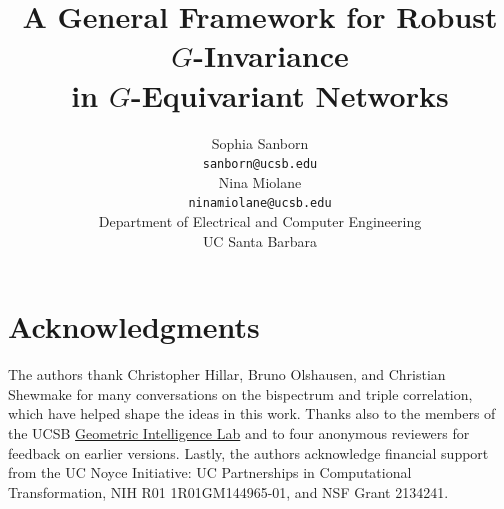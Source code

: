 \documentclass{article}
\title{A General Framework for Robust $G$-Invariance \\ in $G$-Equivariant Networks}
\author{%
  Sophia Sanborn\\
  \texttt{sanborn@ucsb.edu} \\
  \And
  Nina Miolane \\
  \texttt{ninamiolane@ucsb.edu} \\
  \And
  \normalfont
    Department of Electrical and Computer Engineering\\
  UC Santa Barbara \vspace{-0.5cm}\\
}
\begin{document}
\maketitle














\newpage
\section*{Acknowledgments}
The authors thank Christopher Hillar, Bruno Olshausen, and Christian Shewmake for many conversations on the bispectrum and triple correlation, which have helped shape the ideas in this work. Thanks also to the members of the UCSB \href{https://gi.ece.ucsb.edu/}{Geometric Intelligence Lab} and to four anonymous reviewers for feedback on earlier versions. Lastly, the authors acknowledge financial support from the UC Noyce Initiative: UC Partnerships in Computational Transformation, NIH R01 1R01GM144965-01, and NSF Grant 2134241.



\footnotesize
\printbibliography


\newpage

\end{document}
